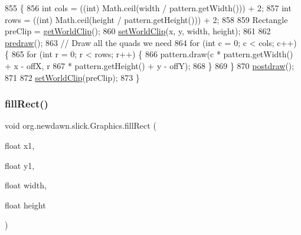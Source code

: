 \begin{DoxyCode}
855                                                    \{
856         \textcolor{keywordtype}{int} cols = ((int) Math.ceil(width / pattern.getWidth())) + 2;
857         \textcolor{keywordtype}{int} rows = ((int) Math.ceil(height / pattern.getHeight())) + 2;
858 
859         Rectangle preClip = \mbox{\hyperlink{classorg_1_1newdawn_1_1slick_1_1_graphics_a706f6649bce845c7e1d40ffefbcd08b8}{getWorldClip}}();
860         \mbox{\hyperlink{classorg_1_1newdawn_1_1slick_1_1_graphics_a9239d1442a3ccdda9880e0a798c6494a}{setWorldClip}}(x, y, width, height);
861 
862         \mbox{\hyperlink{classorg_1_1newdawn_1_1slick_1_1_graphics_a7b4c203181e3b6302d51ed9b24596b8d}{predraw}}();
863         \textcolor{comment}{// Draw all the quads we need}
864         \textcolor{keywordflow}{for} (\textcolor{keywordtype}{int} c = 0; c < cols; c++) \{
865             \textcolor{keywordflow}{for} (\textcolor{keywordtype}{int} r = 0; r < rows; r++) \{
866                 pattern.draw(c * pattern.getWidth() + x - offX, r
867                         * pattern.getHeight() + y - offY);
868             \}
869         \}
870         \mbox{\hyperlink{classorg_1_1newdawn_1_1slick_1_1_graphics_abe054371d1486618ff327bbbcf02ff97}{postdraw}}();
871 
872         \mbox{\hyperlink{classorg_1_1newdawn_1_1slick_1_1_graphics_a9239d1442a3ccdda9880e0a798c6494a}{setWorldClip}}(preClip);
873     \}
\end{DoxyCode}
\mbox{\label{classorg_1_1newdawn_1_1slick_1_1_graphics_ae6bf6995a6ea58569e8879e00ce8e365}} 
\subsubsection{\texorpdfstring{fill\+Rect()}{fillRect()}\hspace{0.1cm}{\footnotesize\ttfamily [2/2]}}
{\footnotesize\ttfamily void org.\+newdawn.\+slick.\+Graphics.\+fill\+Rect (\begin{DoxyParamCaption}\item[{float}]{x1,  }\item[{float}]{y1,  }\item[{float}]{width,  }\item[{float}]{height }\end{DoxyParamCaption})\hspace{0.3cm}{\ttfamily [inline]}}

